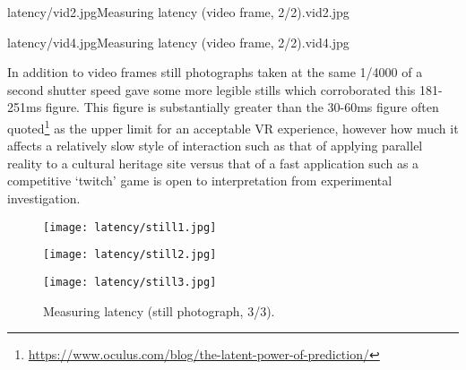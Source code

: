        {latency/vid2.jpg}{Measuring latency (video frame, 2/2).}{vid2.jpg}

       {latency/vid4.jpg}{Measuring latency (video frame, 2/2).}{vid4.jpg}

In addition to video frames still photographs taken at the same 1/4000 of a second shutter speed gave some more legible stills which corroborated this 181-251ms figure. This figure is substantially greater than the 30-60ms figure often quoted\footnote{\url{https://www.oculus.com/blog/the-latent-power-of-prediction/}} as the upper limit for an acceptable VR experience, however how much it affects a relatively slow style of interaction such as that of applying parallel reality to a cultural heritage site versus that of a fast application such as a competitive `twitch' game is open to interpretation from experimental investigation.

\begin{figure}[h]
    \begin{center}
    \begin{minipage}{.32\textwidth}
        \begin{center}
        \texttt{[image: latency/still1.jpg]}
        \caption{Measuring latency (still photograph, 1/3).}
        \label{still1.jpg}
        \end{center}
    \end{minipage}%
    \hspace{.01\textwidth}
    \begin{minipage}{.32\textwidth}
		\begin{center}
        \texttt{[image: latency/still2.jpg]}
        \caption{Measuring latency (still photograph, 2/3).}
        \label{still2.jpg}
        \end{center}
    \end{minipage}%
    \hspace{.01\textwidth}
    \begin{minipage}{.32\textwidth}
        \begin{center}
        \texttt{[image: latency/still3.jpg]}
        \caption{Measuring latency (still photograph, 3/3).}
        \label{still3.jpg}
        \end{center}
    \end{minipage}
    \end{center}
\end{figure}

